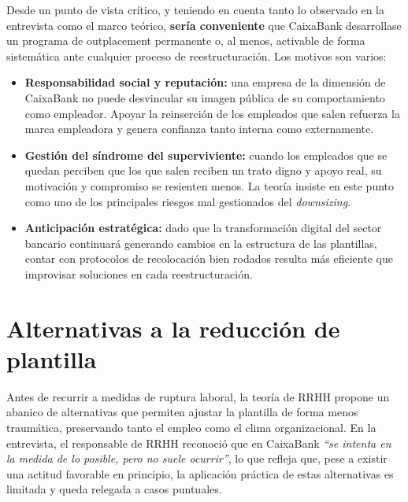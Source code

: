 Desde un punto de vista crítico, y teniendo en cuenta tanto lo observado en
la entrevista como el marco teórico, \textbf{sería conveniente} que CaixaBank
desarrollase un programa de outplacement permanente o, al menos, activable
de forma sistemática ante cualquier proceso de reestructuración. Los motivos
son varios:

\begin{itemize}
  \item \textbf{Responsabilidad social y reputación:} una empresa de la
        dimensión de CaixaBank no puede desvincular su imagen pública de
        su comportamiento como empleador. Apoyar la reinserción de los
        empleados que salen refuerza la marca empleadora y genera confianza
        tanto interna como externamente.
  \item \textbf{Gestión del síndrome del superviviente:} cuando los
        empleados que se quedan perciben que los que salen reciben un trato
        digno y apoyo real, su motivación y compromiso se resienten menos.
        La teoría insiste en este punto como uno de los principales riesgos
        mal gestionados del \textit{downsizing}.
  \item \textbf{Anticipación estratégica:} dado que la transformación digital
        del sector bancario continuará generando cambios en la estructura de
        las plantillas, contar con protocolos de recolocación bien rodados
        resulta más eficiente que improvisar soluciones en cada reestructuración.
\end{itemize}




\section{Alternativas a la reducción de plantilla}

Antes de recurrir a medidas de ruptura laboral, la teoría de RRHH propone
un abanico de alternativas que permiten ajustar la plantilla de forma
menos traumática, preservando tanto el empleo como el clima organizacional.
En la entrevista, el responsable de RRHH reconoció que en CaixaBank
\textit{``se intenta en la medida de lo posible, pero no suele ocurrir''},
lo que refleja que, pese a existir una actitud favorable en principio,
la aplicación práctica de estas alternativas es limitada y queda relegada
a casos puntuales.

